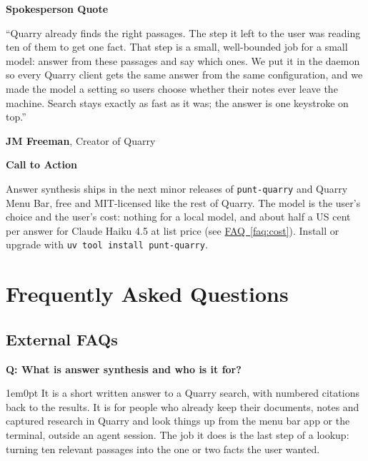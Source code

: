 \documentclass[11pt,letterpaper]{article}
\newcommand{\prsection}[1]{%
  \vspace{1em}%
  {\large\bfseries\color{SectionBlue}#1}%
  \vspace{0.3em}\par%
}
\newcounter{faqnum}
\newenvironment{faqpair}[1]{%
  \needspace{4\baselineskip}%
  \vspace{0.5em}%
  \refstepcounter{faqnum}%
  \noindent\textbf{\color{SectionBlue}Q\thefaqnum: #1}\par\nopagebreak[4]%
  \vspace{0.2em}%
  \begin{adjustwidth}{1em}{0pt}%
  \setlength{\parindent}{0pt}%
}{%
  \end{adjustwidth}%
  \vspace{0.5em}%
}
\newcommand{\faqref}[1]{\hyperref[#1]{FAQ~\ref*{#1}}}
\begin{document}
\prsection{Spokesperson Quote}

\begin{spokespersonquote}
``Quarry already finds the right passages. The step it left to the user was
reading ten of them to get one fact. That step is a small, well-bounded job for
a small model: answer from these passages and say which ones. We put it in the
daemon so every Quarry client gets the same answer from the same configuration,
and we made the model a setting so users choose whether their notes ever leave
the machine. Search stays exactly as fast as it was; the answer is one
keystroke on top.''

\raggedleft \textbf{JM Freeman}, Creator of Quarry
\end{spokespersonquote}

\prsection{Call to Action}

Answer synthesis ships in the next minor releases of \texttt{punt-quarry} and
Quarry Menu Bar, free and MIT-licensed like the rest of Quarry. The model is
the user's choice and the user's cost: nothing for a local model, and about
half a US cent per answer for Claude Haiku 4.5 at list price
(see \faqref{faq:cost}). Install or upgrade with
\texttt{uv tool install punt-quarry}.


\newpage
\section*{Frequently Asked Questions}

\subsection*{External FAQs}

\begin{faqpair}{What is answer synthesis and who is it for?}\label{faq:what}
  It is a short written answer to a Quarry search, with numbered citations
  back to the results. It is for people who already keep their documents,
  notes and captured research in Quarry and look things up from the menu bar
  app or the terminal, outside an agent session. The job it does is the last
  step of a lookup: turning ten relevant passages into the one or two facts the
  user wanted.
\end{faqpair}
\end{document}
